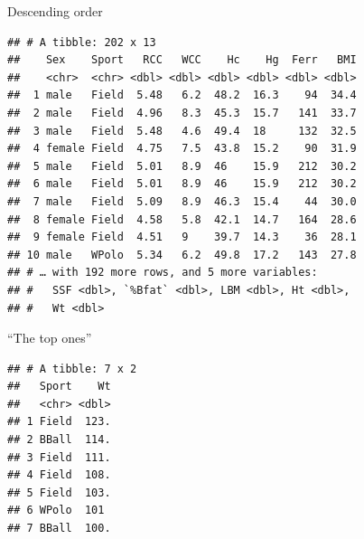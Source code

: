 \documentclass[
  ignorenonframetext,
]{beamer}
\newenvironment{Shaded}{\begin{snugshade}}{\end{snugshade}}
\newcommand{\DecValTok}[1]{\textcolor[rgb]{0.00,0.00,0.81}{#1}}
\newcommand{\KeywordTok}[1]{\textcolor[rgb]{0.13,0.29,0.53}{\textbf{#1}}}
\newcommand{\NormalTok}[1]{#1}
\newcommand{\OperatorTok}[1]{\textcolor[rgb]{0.81,0.36,0.00}{\textbf{#1}}}
\newcommand{\StringTok}[1]{\textcolor[rgb]{0.31,0.60,0.02}{#1}}
\begin{document}
\begin{frame}[fragile]{Descending order}
\protect\hypertarget{descending-order}{}

\begin{Shaded}
\end{Shaded}

\begin{verbatim}
## # A tibble: 202 x 13
##    Sex    Sport   RCC   WCC    Hc    Hg  Ferr   BMI
##    <chr>  <chr> <dbl> <dbl> <dbl> <dbl> <dbl> <dbl>
##  1 male   Field  5.48   6.2  48.2  16.3    94  34.4
##  2 male   Field  4.96   8.3  45.3  15.7   141  33.7
##  3 male   Field  5.48   4.6  49.4  18     132  32.5
##  4 female Field  4.75   7.5  43.8  15.2    90  31.9
##  5 male   Field  5.01   8.9  46    15.9   212  30.2
##  6 male   Field  5.01   8.9  46    15.9   212  30.2
##  7 male   Field  5.09   8.9  46.3  15.4    44  30.0
##  8 female Field  4.58   5.8  42.1  14.7   164  28.6
##  9 female Field  4.51   9    39.7  14.3    36  28.1
## 10 male   WPolo  5.34   6.2  49.8  17.2   143  27.8
## # … with 192 more rows, and 5 more variables:
## #   SSF <dbl>, `%Bfat` <dbl>, LBM <dbl>, Ht <dbl>,
## #   Wt <dbl>
\end{verbatim}

\end{frame}

\begin{frame}[fragile]{``The top ones''}
\protect\hypertarget{the-top-ones}{}

\begin{Shaded}
\end{Shaded}

\begin{verbatim}
## # A tibble: 7 x 2
##   Sport    Wt
##   <chr> <dbl>
## 1 Field  123.
## 2 BBall  114.
## 3 Field  111.
## 4 Field  108.
## 5 Field  103.
## 6 WPolo  101 
## 7 BBall  100.
\end{verbatim}

\end{frame}
\end{document}
